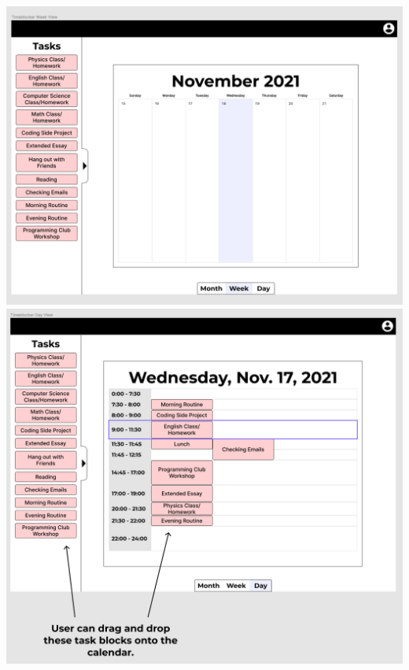 \documentclass[12pt]{report}
\begin{document}
\includegraphics[width=\textwidth]{week-view.png}
\includegraphics[width=\textwidth]{day-view.png}

\newpage
\end{document}
